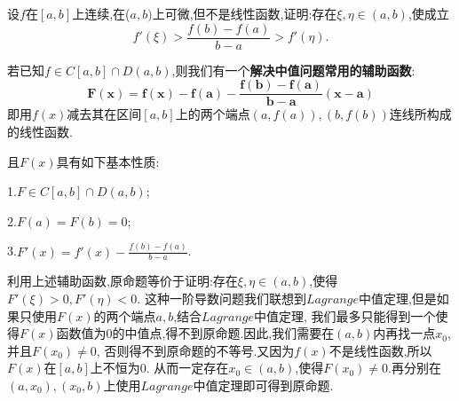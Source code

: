 \documentclass[lang=cn,newtx,10pt,scheme=chinese]{../Template/elegantbook}
\begin{document}
\begin{exercise}
    设$f$在$[a,b]$上连续,在($a,b)$上可微,但不是线性函数,证明:存在$\xi,\eta\in(a,b)$,使成立
    \begin{equation}
            f'(\xi)>\frac{f(b)-f(a)}{b-a}>f'(\eta).
        \nonumber
    \end{equation}
\end{exercise}
\begin{conclusion}
    若已知$f\in C\left[ a,b \right] \cap D\left( a,b \right)$,则我们有一个\hypertarget{中值问题常用辅助函数(利用线性函数构造)}{\textbf{解决中值问题常用的辅助函数}}:
    \begin{equation}
        \boldsymbol{F}\left( \boldsymbol{x} \right) =\boldsymbol{f}\left( \boldsymbol{x} \right) -\boldsymbol{f}\left( \boldsymbol{a} \right) -\frac{\boldsymbol{f}\left( \boldsymbol{b} \right) -\boldsymbol{f}\left( \boldsymbol{a} \right)}{\boldsymbol{b}-\boldsymbol{a}}\left( \boldsymbol{x}-\boldsymbol{a} \right) 
        \nonumber
    \end{equation}
    即用$f(x)$减去其在区间$[a,b]$上的两个端点$(a,f(a)),(b,f(b))$连线所构成的线性函数.
    
    且$F(x)$具有如下基本性质:
    
    1.$F\in C\left[ a,b \right] \cap D\left( a,b \right)$;

    2.$F(a)=F(b)=0$;

    3.$F'(x)=f'(x)-\frac{f\left( b \right) -f\left( a \right)}{b-a}$.
\end{conclusion}
\begin{note}
    利用上述辅助函数,原命题等价于证明:存在$\xi,\eta\in(a,b)$,使得$F'(\xi)>0,F'(\eta)<0$.
    这种一阶导数问题我们联想到$Lagrange$中值定理,但是如果只使用$F(x)$的两个端点$a,b$,结合$Lagrange$中值定理,
    我们最多只能得到一个使得$F(x)$函数值为0的中值点,得不到原命题.因此,我们需要在$(a,b)$内再找一点$x_0$,并且$F(x_0)\ne0$,
    否则得不到原命题的不等号.又因为$f(x)$不是线性函数,所以$F(x)$在$[a,b]$上不恒为0.
    从而一定存在$x_0\in(a,b)$,使得$F(x_0)\ne0$.再分别在$(a,x_0),(x_0,b)$上使用$Lagrange$中值定理即可得到原命题.
\end{note}
\end{document}

